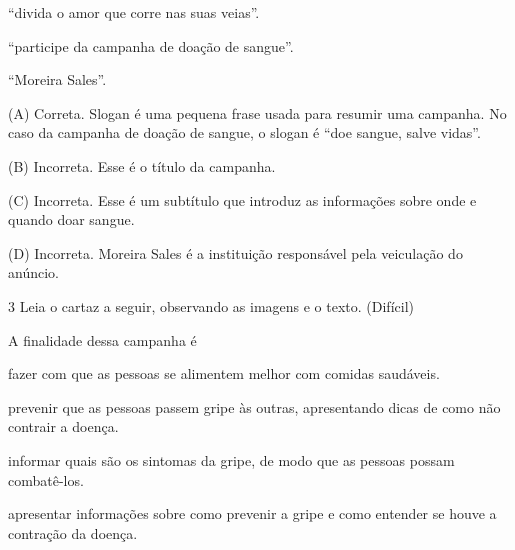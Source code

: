 \begin{escolha}
\begin{escolha}
\begin{escolha}
\item ``divida o amor que corre nas suas veias''.

\item ``participe da campanha de doação de sangue''.

\item ``Moreira Sales''.
\end{escolha}


(A) Correta. Slogan é uma pequena frase usada para resumir uma campanha.
No caso da campanha de doação de sangue, o slogan é ``doe sangue, salve
vidas''.

(B) Incorreta. Esse é o título da campanha.

(C) Incorreta. Esse é um subtítulo que introduz as informações sobre
onde e quando doar sangue.

(D) Incorreta. Moreira Sales é a instituição responsável pela veiculação
do anúncio.

\num{3} Leia o cartaz a seguir, observando as imagens e o texto. (Difícil)


A finalidade dessa campanha é

\begin{escolha}
\item fazer com que as pessoas se alimentem melhor com comidas saudáveis.

\item prevenir que as pessoas passem gripe às outras, apresentando dicas
de como não contrair a doença.

\item informar quais são os sintomas da gripe, de modo que as pessoas
possam combatê-los.

\item apresentar informações sobre como prevenir a gripe e como entender
se houve a contração da doença.
\end{escolha}


\end{escolha}
\end{escolha}
